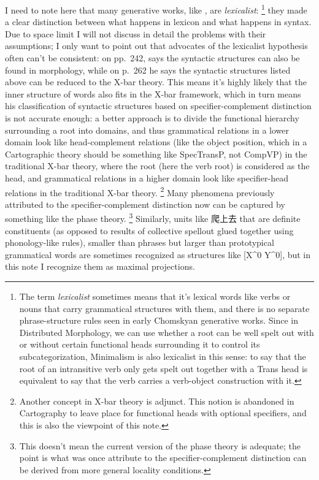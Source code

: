 \documentclass[UTF8, a4paper, oneside, scheme=plain, 12pt]{ctexrep}
\newcommand*{\citepage}[1]{p.~{#1}}
\newcommand*{\citepages}[1]{pp.~{#1}}
\newcommand*{\term}[1]{\emph{#1}}
\begin{document}
{I need to note here that 
many generative works, like \citet{deng2010formal},
are \emph{lexicalist}:%
\footnote{
    The term \term{lexicalist} sometimes means that  
    it's lexical words like verbs or nouns that carry grammatical structures with them, 
    and there is no separate phrase-structure rules 
    seen in early Chomskyan generative works.
    Since in Distributed Morphology, 
    we can use whether a root can be well spelt out 
    with or without certain functional heads surrounding it 
    to control its subcategorization,
    Minimalism is also lexicalist in this sense:
    to say that the root of an intransitive verb 
    only gets spelt out together with a Trans head 
    is equivalent to say that the verb carries a verb-object construction with it.
} 
they made a clear distinction between what happens in lexicon 
and what happens in syntax. 
Due to space limit I will not discuss in detail
the problems with their assumptions;
I only want to point out that advocates of the lexicalist hypothesis 
often can't be consistent:
on \citepages{242}, \citet{deng2010formal} says the syntactic structures 
can also be found in morphology,
while on \citepage{262} he says 
the syntactic structures listed above 
can be reduced to the X-bar theory.
This means it's highly likely that the inner structure of words 
also fits in the X-bar framework,
which in turn means his classification of syntactic structures 
based on specifier-complement distinction is not accurate enough:
a better approach is to divide the functional hierarchy surrounding a root into domains, 
and thus grammatical relations in a lower domain look like 
head-complement relations (like the object position, 
which in a Cartographic theory should be something like SpecTransP, 
not CompVP) in the traditional X-bar theory, 
where the root (here the verb root) is considered as the head,
and grammatical relations in a higher domain look like 
specifier-head relations in the traditional X-bar theory.%
\footnote{
    Another concept in X-bar theory is adjunct.
    This notion is abandoned in Cartography 
    to leave place for functional heads with optional specifiers, 
    and this is also the viewpoint of this note.
}
Many phenomena previously attributed to the specifier-complement distinction 
now can be captured by something like the phase theory.%
\footnote{
    This doesn't mean the current version of the phase theory 
    is adequate; the point is what was once attribute to the specifier-complement distinction
    can be derived from more general locality conditions. 
}
Similarly, units like 爬上去 that are
definite constituents (as opposed to results of collective spellout glued together
using phonology-like rules), 
smaller than phrases 
but larger than prototypical grammatical words 
are sometimes recognized as structures like [X^0 Y^0],
but in this note I recognize them as
maximal projections.


}
\end{document}
